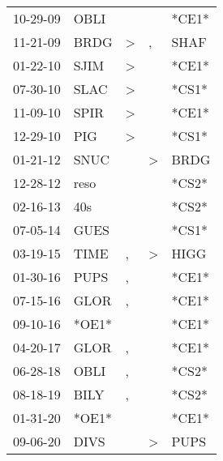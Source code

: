 \begin{supertabular}{p{0.07\textwidth}p{0.06\textwidth}p{0.02\textwidth}p{0.02\textwidth}p{0.06\textwidth}}
 10-29-09\textsuperscript{} &  OBLI\textsuperscript{} &               &               &                   *CE1* \\
 11-21-09\textsuperscript{} &  BRDG\textsuperscript{} &  \textgreater &             , &  SHAF\textsuperscript{} \\
 01-22-10\textsuperscript{} &  SJIM\textsuperscript{} &  \textgreater &               &                   *CE1* \\
 07-30-10\textsuperscript{} &  SLAC\textsuperscript{} &  \textgreater &               &                   *CS1* \\
 11-09-10\textsuperscript{} &  SPIR\textsuperscript{} &  \textgreater &               &                   *CE1* \\
 12-29-10\textsuperscript{} &   PIG\textsuperscript{} &  \textgreater &               &                   *CS1* \\
 01-21-12\textsuperscript{} &  SNUC\textsuperscript{} &               &  \textgreater &  BRDG\textsuperscript{} \\
 12-28-12\textsuperscript{} &  reso\textsuperscript{} &               &               &                   *CS2* \\
 02-16-13\textsuperscript{} &   40s\textsuperscript{} &               &               &                   *CS2* \\
 07-05-14\textsuperscript{} &  GUES\textsuperscript{} &               &               &                   *CS1* \\
 03-19-15\textsuperscript{} &  TIME\textsuperscript{} &             , &  \textgreater &  HIGG\textsuperscript{} \\
 01-30-16\textsuperscript{} &  PUPS\textsuperscript{} &             , &               &                   *CE1* \\
 07-15-16\textsuperscript{} &  GLOR\textsuperscript{} &             , &               &                   *CE1* \\
 09-10-16\textsuperscript{} &                   *OE1* &               &               &                   *CE1* \\
 04-20-17\textsuperscript{} &  GLOR\textsuperscript{} &             , &               &                   *CE1* \\
 06-28-18\textsuperscript{} &  OBLI\textsuperscript{} &             , &               &                   *CS2* \\
 08-18-19\textsuperscript{} &  BILY\textsuperscript{} &             , &               &                   *CS2* \\
 01-31-20\textsuperscript{} &                   *OE1* &               &               &                   *CE1* \\
 09-06-20\textsuperscript{} &  DIVS\textsuperscript{} &               &  \textgreater &  PUPS\textsuperscript{} \\
\end{supertabular}
